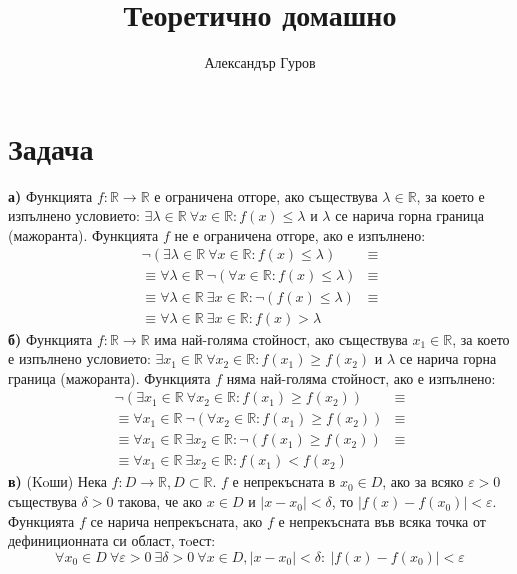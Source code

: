 \documentclass{article}
\title{Теоретично домашно}
\author{Александър Гуров}
\date{\datebulgarian{\today}}
\newcommand*{\bR}{\mathbb{R}}
\begin{document}
\maketitle

\section{Задача}

\textbf{а)}
Функцията $f: \bR \rightarrow \bR$ е ограничена отгоре, ако съществува $\lambda \in \bR$, за което е изпълнено условието:
$\exists\lambda \in \bR \ \forall x \in \bR : f(x)\leq\lambda$ и $\lambda$ се нарича горна граница (мажоранта). Функцията $f$ не е ограничена отгоре,
ако е изпълнено:
\begin{align*}
    \neg(\exists\lambda \in \bR \ \forall x \in \bR : f(x)\leq\lambda)       & \equiv \\
    \equiv\forall\lambda \in \bR \ \neg(\forall x \in \bR : f(x)\leq\lambda) & \equiv \\
    \equiv\forall\lambda \in \bR \ \exists x \in \bR : \neg(f(x)\leq\lambda) & \equiv \\
    \equiv\forall\lambda \in \bR \ \exists x \in \bR : f(x)>\lambda          &
\end{align*}
\textbf{б)}
Функцията $f: \bR \rightarrow \bR$ има най-голяма стойност, ако съществува $x_1 \in \bR$, за което е изпълнено условието:
$\exists x_1 \in\bR \ \forall x_2 \in \bR: f(x_1)\geq f(x_2)$ и $\lambda$ се нарича горна граница (мажоранта). Функцията $f$ няма
най-голяма стойност, ако е изпълнено:
\begin{align*}
    \neg(\exists x_1 \in\bR \ \forall x_2 \in \bR: f(x_1)\geq f(x_2))       & \equiv \\
    \equiv\forall x_1 \in\bR \ \neg(\forall x_2 \in \bR: f(x_1)\geq f(x_2)) & \equiv \\
    \equiv\forall x_1 \in\bR \ \exists x_2 \in \bR: \neg(f(x_1)\geq f(x_2)) & \equiv \\
    \equiv\forall x_1 \in\bR \ \exists x_2 \in \bR: f(x_1)< f(x_2)          &
\end{align*}
\textbf{в)} (Koши) Нека $f : D \rightarrow \bR, D \subset \bR$. $f$ е непрекъсната в $x_0 \in D$, ако за всяко $\varepsilon > 0$
съществува $\delta > 0$ такова, че ако $x \in D$ и $|x - x_0| < \delta$, то $|f (x) - f (x_0)| < \varepsilon$.
Функцията $f$ се нарича непрекъсната, ако $f$ е непрекъсната във всяка точка от дефиниционната си област,
тoест:
\[
    \forall x_0 \in D \ \forall \varepsilon > 0 \ \exists \delta > 0 \  \forall x \in D, |x - x_0| < \delta : \ |f (x) - f (x_0)| < \varepsilon
\]
\end{document}
